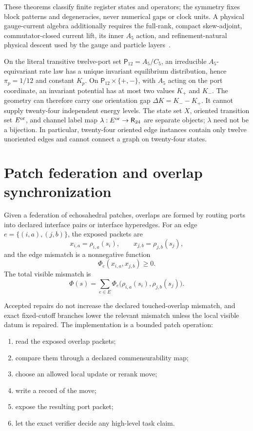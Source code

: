\documentclass[11pt]{article}
\theoremstyle{remark}
\theoremstyle{plain}
\begin{document}
These theorems classify finite register states and operators; the symmetry
fixes block patterns and degeneracies, never numerical gaps or clock units.
A physical gauge-current algebra additionally requires the full-rank,
compact skew-adjoint, commutator-closed current lift, its inner \(A_5\)
action, and refinement-natural physical descent used by the gauge and
particle layers~\cite{ophGauge,ophparticles}.

On the literal transitive twelve-port set \(\mathsf P_{12}=A_5/C_5\), an irreducible
\(A_5\)-equivariant rate law has a unique invariant equilibrium distribution, hence
\(\pi_p=1/12\) and constant \(K_p\). On
\(\mathsf P_{12}\times\{+,-\}\), with \(A_5\) acting on the port coordinate, an invariant
potential has at most two values \(K_+\) and \(K_-\). The geometry can therefore carry one
orientation gap \(\Delta K=K_--K_+\). It cannot supply twenty-four independent energy levels.
The state set \(X\), oriented transition set \(E^{\rm or}\), and channel label map
\(\lambda:E^{\rm or}\to\mathsf R_{24}\) are separate objects; \(\lambda\) need not be a
bijection. In particular, twenty-four oriented edge instances contain only twelve unoriented
edges and cannot connect a graph on twenty-four states.

\section{Patch federation and overlap synchronization}
\label{sec:federation-synchronization}

Given a federation of echosahedral patches, overlaps are formed by routing ports into declared
interface pairs or interface hyperedges. For an edge \(e=\{(i,a),(j,b)\}\), the exposed packets
are
\[
x_{i,a}=\rho_{i,a}(s_i),\qquad x_{j,b}=\rho_{j,b}(s_j),
\]
and the edge mismatch is a nonnegative function
\[
\Phi_e(x_{i,a},x_{j,b})\ge 0.
\]
The total visible mismatch is
\[
\Phi(s)=\sum_{e\in E}\Phi_e\bigl(\rho_{i,a}(s_i),\rho_{j,b}(s_j)\bigr).
\]

Accepted repairs do not increase the declared touched-overlap mismatch, and
exact fixed-cutoff branches lower the relevant mismatch unless the local
visible datum is repaired. The implementation is a bounded patch operation:
\begin{enumerate}[leftmargin=2em]
\item read the exposed overlap packets;
\item compare them through a declared commensurability map;
\item choose an allowed local update or rerank move;
\item write a record of the move;
\item expose the resulting port packet;
\item let the exact verifier decide any high-level task claim.
\end{enumerate}
\end{document}
